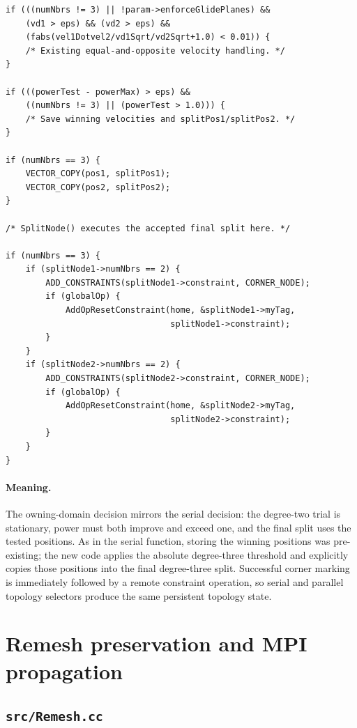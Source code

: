 \documentclass[11pt]{article}
\begin{document}
\begin{lstlisting}[style=cpp]
if (((numNbrs != 3) || !param->enforceGlidePlanes) &&
    (vd1 > eps) && (vd2 > eps) &&
    (fabs(vel1Dotvel2/vd1Sqrt/vd2Sqrt+1.0) < 0.01)) {
    /* Existing equal-and-opposite velocity handling. */
}

if (((powerTest - powerMax) > eps) &&
    ((numNbrs != 3) || (powerTest > 1.0))) {
    /* Save winning velocities and splitPos1/splitPos2. */
}

if (numNbrs == 3) {
    VECTOR_COPY(pos1, splitPos1);
    VECTOR_COPY(pos2, splitPos2);
}

/* SplitNode() executes the accepted final split here. */

if (numNbrs == 3) {
    if (splitNode1->numNbrs == 2) {
        ADD_CONSTRAINTS(splitNode1->constraint, CORNER_NODE);
        if (globalOp) {
            AddOpResetConstraint(home, &splitNode1->myTag,
                                 splitNode1->constraint);
        }
    }
    if (splitNode2->numNbrs == 2) {
        ADD_CONSTRAINTS(splitNode2->constraint, CORNER_NODE);
        if (globalOp) {
            AddOpResetConstraint(home, &splitNode2->myTag,
                                 splitNode2->constraint);
        }
    }
}
\end{lstlisting}

\paragraph{Meaning.}
The owning-domain decision mirrors the serial decision: the degree-two trial
is stationary, power must both improve and exceed one, and the final split
uses the tested positions.  As in the serial function, storing the winning
positions was pre-existing; the new code applies the absolute degree-three
threshold and explicitly copies those positions into the final degree-three
split.  Successful corner marking is immediately followed by a remote
constraint operation, so serial and parallel topology selectors produce the
same persistent topology state.

\section{Remesh preservation and MPI propagation}

\subsection{\texttt{src/Remesh.cc}}
\end{document}
